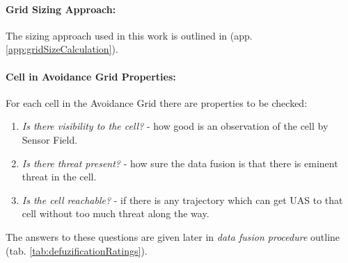 
\paragraph{Grid Sizing Approach:} The sizing approach used in this work is outlined in (app. \ref{app:gridSizeCalculation}).


\paragraph{Cell in Avoidance Grid Properties:}\noindent For each cell in the Avoidance Grid there are properties to be checked:

\begin{enumerate}
    \item \emph{Is there visibility to the cell?} - how good is an observation of the cell by Sensor Field.
    
    \item \emph{Is there threat present?} - how sure the data fusion is that there is eminent threat in the cell.
    
    \item \emph{Is the cell reachable?} - if there is any trajectory which can get UAS to that cell without too much threat along the way.
\end{enumerate}

\noindent The answers to these questions are given later in \emph{data fusion procedure} outline (tab. \ref{tab:defuzificationRatings}).
